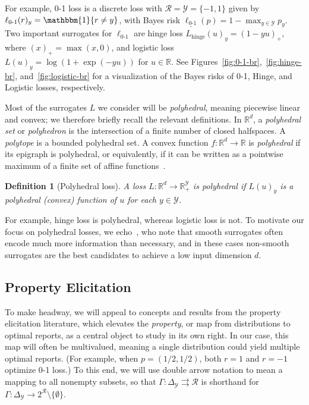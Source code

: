 \documentclass[12pt]{article}
\newcommand{\Comments}{1}
\newcommand{\mynote}[2]{\ifnum\Comments=1\textcolor{#1}{#2}\fi}
\newcommand{\jessie}[1]{\mynote{teal}{[JF: #1]}}
\newcommand{\reals}{\mathbb{R}}
\newcommand{\simplex}{\Delta_\Y}
\newcommand{\R}{\mathcal{R}}
\newcommand{\U}{\mathcal{U}}
\newcommand{\Y}{\mathcal{Y}}
\newcommand{\risk}[1]{\underline{#1}}
\newcommand{\toto}{\rightrightarrows}
\newcommand{\ones}{\mathbbm{1}}
\newcommand{\Ind}[1]{\ones\{#1\}}
\newcommand{\hinge}{L_{\mathrm{hinge}}}
\newcommand{\ellzo}{\ell_{\text{0-1}}}
\newtheorem{definition}{Definition}
\begin{document}
For example, 0-1 loss is a discrete loss with $\R = \Y = \{-1,1\}$
given by $\ellzo(r)_y = \Ind{r \neq y}$, with Bayes risk $\risk{\ellzo}(p) = 1-\max_{y\in\Y} p_y$.
Two important surrogates for $\ellzo$ are hinge loss $\hinge(u)_y = (1-yu)_+$, where $(x)_+ = \max(x,0)$, and logistic loss $L(u)_y = \log(1+\exp(-yu))$ for $u\in\reals$.
See Figures~\ref{fig:0-1-br},~\ref{fig:hinge-br}, and~\ref{fig:logistic-br} for a visualization of the Bayes risks of 0-1, Hinge, and Logistic losses, respectively.

Most of the surrogates $L$ we consider will be \emph{polyhedral}, meaning piecewise linear and convex; we therefore briefly recall the relevant definitions.
In $\reals^d$, a \emph{polyhedral set} or \emph{polyhedron} is the intersection of a finite number of closed halfspaces.
A \emph{polytope} is a bounded polyhedral set.
A convex function $f:\reals^d\to\reals$ is \emph{polyhedral} if its epigraph is polyhedral, or equivalently, if it can be written as a pointwise maximum of a finite set of affine functions~\citep{rockafellar1997convex}.
%
\begin{definition}[Polyhedral loss]
  A loss $L: \reals^d \to \reals^{\Y}_+$ is \emph{polyhedral} if $L(u)_y$ is a polyhedral (convex) function of $u$ for each $y\in\Y$.
\end{definition}
%
For example, hinge loss is polyhedral, whereas logistic loss is not.
To motivate our focus on polyhedral losses, we echo~\citet[Section~1.2]{ramaswamy2018consistent}, who note that smooth surrogates often encode much more information than necessary, and in these cases non-smooth surrogates are the best candidates to achieve a low input dimension $d$.

\subsection{Property Elicitation}
\label{sec:property-elicitation}

To make headway, we will appeal to concepts and results from the property elicitation literature, which elevates the \emph{property}, or map from distributions to optimal reports, as a central object to study in its own right.
In our case, this map will often be multivalued, meaning a single distribution could yield multiple optimal reports.
(For example, when $p=(1/2,1/2)$, both $r=1$ and $r=-1$ optimize 0-1 loss.)
To this end, we will use double arrow notation to mean a mapping to all nonempty subsets, so that $\Gamma: \simplex \toto \R$ is shorthand for $\Gamma: \simplex \to 2^{\R} \setminus \{\emptyset\}$.
\end{document}
